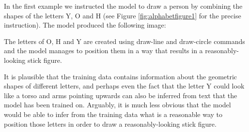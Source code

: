 In the first example we instructed the model to draw a person by combining the shapes of the letters Y, O and H (see Figure \ref{fig:alphabetfigure1} for the precise instruction). The model produced the following image:

\begin{figure}
\end{figure}

\begin{center}
\end{center}
The letters of O, H and Y are created using draw-line and draw-circle commands and the model manages to position them in a way that results in a reasonably-looking stick figure. 

It is plausible that the training data contains information about the geometric shapes of different letters, and perhaps even the fact that the letter Y could look like a torso and arms pointing upwards can also be inferred from text that the model has been trained on. Arguably, it is much less obvious that the model would be able to infer from the training data what is a reasonable way to position those letters in order to draw a reasonably-looking stick figure.

